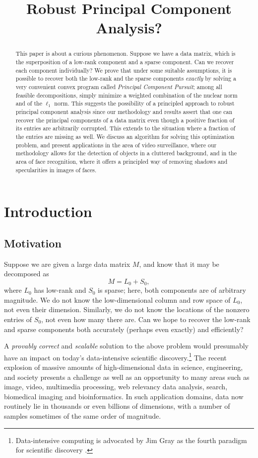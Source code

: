 \title{Robust Principal Component Analysis?}

\begin{abstract}
This paper is about a curious phenomenon. Suppose we have a data matrix, which is the superposition of a low-rank component and a sparse component. Can we recover each component individually? We prove that under some suitable assumptions, it is possible to recover both the low-rank and the sparse components {\em exactly} by solving a very convenient convex program called {\em Principal Component Pursuit}; among all feasible decompositions, simply minimize a weighted combination of the nuclear norm and of the $\ell_1$ norm.  This suggests the possibility of a principled approach to robust principal component analysis since our methodology and results assert that one can recover the principal components of a data matrix even though a positive fraction of its entries are arbitrarily corrupted. This extends to the situation where a fraction of the entries are missing as well.  We discuss an algorithm for solving this optimization problem, and present applications in the area of video surveillance, where our methodology allows for the detection of objects in a cluttered background, and in the area of face recognition, where it offers a principled way of removing shadows and specularities in images of faces.
\end{abstract}

\section{Introduction}
\label{sec:intro}

\subsection{Motivation}
\label{sec:motivation}

Suppose we are given a large data matrix $M$, and know that it may be decomposed as
\[
M = L_0 + S_0,
\]
where $L_0$ has low-rank and $S_0$ is sparse; here, both components are of arbitrary magnitude.  We do not know the low-dimensional column and row space of $L_0$, not even their dimension. Similarly, we do not know the locations of the nonzero entries of $S_0$, not even how many there are.  Can we hope to recover the low-rank and sparse components both accurately (perhaps even exactly) and efficiently?

A {\em provably correct} and {\em scalable} solution to the above problem would presumably have an impact on today's data-intensive scientific discovery.\footnote{Data-intensive computing is advocated by Jim Gray as the fourth paradigm for scientific discovery \cite{Tony-Hey}.}  The recent explosion of massive amounts of high-dimensional data in science, engineering, and society presents a challenge as well as an opportunity to many areas such as image, video, multimedia processing, web relevancy data analysis, search, biomedical imaging and bioinformatics. In such application domains, data now routinely lie in thousands or even billions of dimensions, with a number of samples sometimes of the same order of magnitude.

